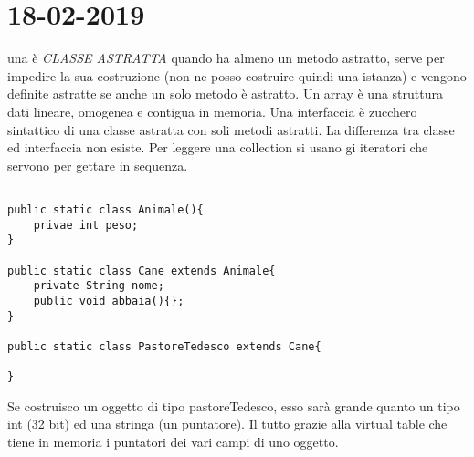 

\newpage
\section{18-02-2019}
\par

una è \textit{CLASSE ASTRATTA} quando ha almeno un metodo astratto, serve per impedire la sua costruzione (non ne posso costruire quindi una istanza) e vengono definite astratte se  anche un solo metodo è astratto. \newline
Un array è una struttura dati lineare, omogenea e contigua in memoria. \newline
Una interfaccia è zucchero sintattico di una classe astratta con soli metodi astratti. \newline
La differenza tra classe ed interfaccia non esiste. \newline
Per leggere una collection si usano gi iteratori che servono per gettare in sequenza.

\begin{lstlisting}[basicstyle=\small,]

public static class Animale(){
	privae int peso;
}

public static class Cane extends Animale{
	private String nome;
	public void abbaia(){};
}

public static class PastoreTedesco extends Cane{

}

\end{lstlisting}

Se costruisco un oggetto di tipo pastoreTedesco, esso sarà grande quanto un tipo int (32 bit) ed una stringa (un puntatore).
Il tutto grazie alla virtual table che tiene in memoria i puntatori dei vari campi di uno oggetto.






